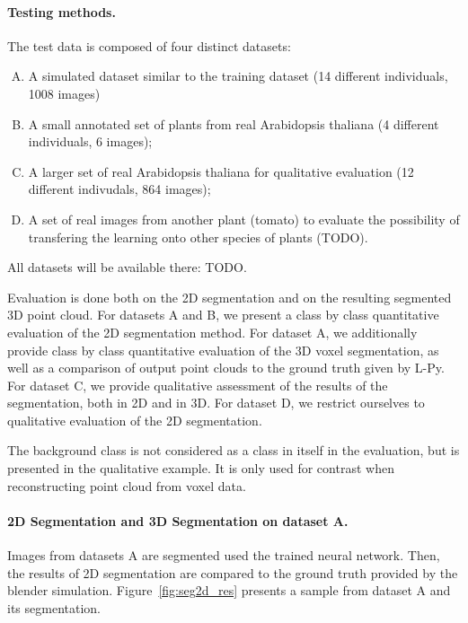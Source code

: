 \paragraph{Testing methods.} The test data is composed of four
distinct datasets:
\begin{enumerate}[A.]
    \item A simulated dataset similar to the training dataset (14 different individuals, 1008 images)
    \item A small annotated set of plants from real Arabidopsis thaliana (4 different individuals, 6 images);
    \item A larger set of real Arabidopsis thaliana for qualitative evaluation (12 different indivudals, 864 images);
    \item A set of real images from another plant (tomato) to evaluate the possibility of transfering the learning onto other species of plants (TODO).
\end{enumerate}
All datasets will be available there: TODO.

Evaluation is done both on the 2D segmentation and on the resulting segmented 3D point cloud. For datasets A and B,
we present a class by class quantitative evaluation of the 2D segmentation method. For dataset A, we additionally  provide
class by class quantitative evaluation of the 3D voxel segmentation, as well as a comparison of output point clouds
to the ground truth given by L-Py. For dataset C, we provide qualitative assessment of the results of the segmentation,
both in 2D and in 3D. For dataset D, we restrict ourselves to qualitative evaluation of the 2D segmentation.

The background class is not considered as a class in itself in the evaluation, but is presented in the qualitative example. It
is only used for contrast when reconstructing point cloud from voxel data.

\paragraph{2D Segmentation and 3D Segmentation on dataset A.}
Images from datasets A are segmented used the trained neural network. Then, the results of 2D segmentation are
compared to the ground truth provided by the blender simulation. Figure~\ref{fig:seg2d_res} presents a sample from
dataset A and its segmentation.

